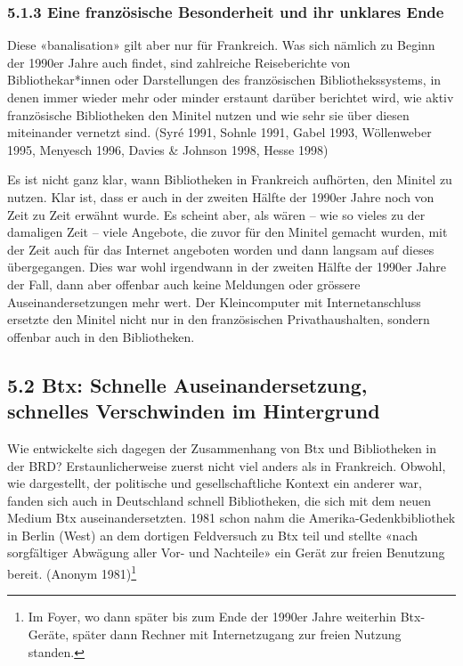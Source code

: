 \documentclass[a4paper,
fontsize=11pt,
oneside,
numbers=noperiodatend,
parskip=half-,
bibliography=totoc,
final
]{scrartcl}
\begin{document}
\hypertarget{eine-franzuxf6sische-besonderheit-und-ihr-unklares-ende}{%
\subsubsection{5.1.3 Eine französische Besonderheit und ihr unklares
Ende}\label{eine-franzuxf6sische-besonderheit-und-ihr-unklares-ende}}

Diese «banalisation» gilt aber nur für Frankreich. Was sich nämlich zu
Beginn der 1990er Jahre auch findet, sind zahlreiche Reiseberichte von
Bibliothekar*innen oder Darstellungen des französischen
Bibliothekssystems, in denen immer wieder mehr oder minder erstaunt
darüber berichtet wird, wie aktiv französische Bibliotheken den Minitel
nutzen und wie sehr sie über diesen miteinander vernetzt sind. (Syré
1991, Sohnle 1991, Gabel 1993, Wöllenweber 1995, Menyesch 1996, Davies
\& Johnson 1998, Hesse 1998)

Es ist nicht ganz klar, wann Bibliotheken in Frankreich aufhörten, den
Minitel zu nutzen. Klar ist, dass er auch in der zweiten Hälfte der
1990er Jahre noch von Zeit zu Zeit erwähnt wurde. Es scheint aber, als
wären -- wie so vieles zu der damaligen Zeit -- viele Angebote, die
zuvor für den Minitel gemacht wurden, mit der Zeit auch für das Internet
angeboten worden und dann langsam auf dieses übergegangen. Dies war wohl
irgendwann in der zweiten Hälfte der 1990er Jahre der Fall, dann aber
offenbar auch keine Meldungen oder grössere Auseinandersetzungen mehr
wert. Der Kleincomputer mit Internetanschluss ersetzte den Minitel nicht
nur in den französischen Privathaushalten, sondern offenbar auch in den
Bibliotheken.

\hypertarget{btx-schnelle-auseinandersetzung-schnelles-verschwinden-im-hintergrund}{%
\subsection{5.2 Btx: Schnelle Auseinandersetzung, schnelles Verschwinden
im
Hintergrund}\label{btx-schnelle-auseinandersetzung-schnelles-verschwinden-im-hintergrund}}

Wie entwickelte sich dagegen der Zusammenhang von Btx und Bibliotheken
in der BRD? Erstaunlicherweise zuerst nicht viel anders als in
Frankreich. Obwohl, wie dargestellt, der politische und
gesellschaftliche Kontext ein anderer war, fanden sich auch in
Deutschland schnell Bibliotheken, die sich mit dem neuen Medium Btx
auseinandersetzten. 1981 schon nahm die Amerika-Gedenkbibliothek in
Berlin (West) an dem dortigen Feldversuch zu Btx teil und stellte «nach
sorgfältiger Abwägung aller Vor- und Nachteile» ein Gerät zur freien
Benutzung bereit. (Anonym 1981)\footnote{Im Foyer, wo dann später bis
  zum Ende der 1990er Jahre weiterhin Btx-Geräte, später dann Rechner
  mit Internetzugang zur freien Nutzung standen.}
\end{document}
